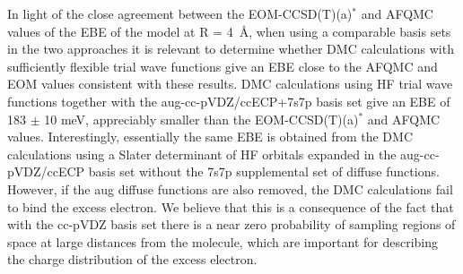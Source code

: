 In light of the close agreement between the EOM-CCSD(T)(a)$^*$ and AFQMC values of the EBE of the  model at R = \SI{4}{\angstrom}, when using a comparable basis sets in the two approaches it is relevant to determine whether DMC calculations with sufficiently flexible trial wave functions give an EBE close to the AFQMC and EOM values consistent with these results.
DMC calculations using HF trial wave functions together with the aug-cc-pVDZ/ccECP+7s7p basis set give an EBE of 183 $\pm$ 10 meV, appreciably smaller than the EOM-CCSD(T)(a)$^*$ and AFQMC values.
Interestingly, essentially the same EBE is obtained from the DMC calculations using a Slater determinant of HF orbitals expanded in the aug-cc-pVDZ/ccECP basis set without the 7s7p supplemental set of diffuse functions.
However, if the aug diffuse functions are also removed, the DMC calculations fail to bind the excess electron.
We believe that this is a consequence of the fact that with the cc-pVDZ basis set there is a near zero probability of sampling regions of space at large distances from the molecule, which are important for describing the charge distribution of the excess electron.
